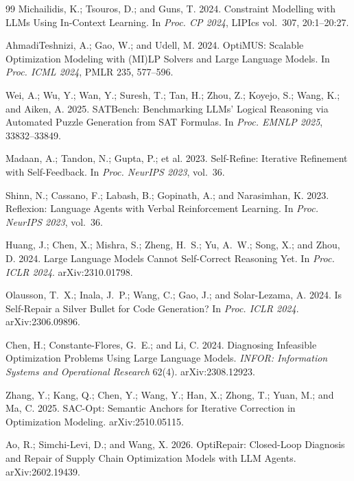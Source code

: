 \documentclass[letterpaper]{article}
\begin{document}
\begin{thebibliography}{99}
Michailidis, K.; Tsouros, D.; and Guns, T. 2024.
Constraint Modelling with LLMs Using In-Context Learning.
In \textit{Proc. CP 2024}, LIPIcs vol.~307, 20:1--20:27.

AhmadiTeshnizi, A.; Gao, W.; and Udell, M. 2024.
OptiMUS: Scalable Optimization Modeling with (MI)LP Solvers and Large
Language Models. In \textit{Proc. ICML 2024}, PMLR 235, 577--596.

Wei, A.; Wu, Y.; Wan, Y.; Suresh, T.; Tan, H.; Zhou, Z.; Koyejo, S.;
Wang, K.; and Aiken, A. 2025.
SATBench: Benchmarking LLMs' Logical Reasoning via Automated Puzzle
Generation from SAT Formulas. In \textit{Proc. EMNLP 2025}, 33832--33849.

Madaan, A.; Tandon, N.; Gupta, P.; et al. 2023.
Self-Refine: Iterative Refinement with Self-Feedback.
In \textit{Proc. NeurIPS 2023}, vol.~36.

Shinn, N.; Cassano, F.; Labash, B.; Gopinath, A.; and Narasimhan, K. 2023.
Reflexion: Language Agents with Verbal Reinforcement Learning.
In \textit{Proc. NeurIPS 2023}, vol.~36.

Huang, J.; Chen, X.; Mishra, S.; Zheng, H.~S.; Yu, A.~W.; Song, X.; and Zhou, D. 2024.
Large Language Models Cannot Self-Correct Reasoning Yet.
In \textit{Proc. ICLR 2024}. arXiv:2310.01798.

Olausson, T.~X.; Inala, J.~P.; Wang, C.; Gao, J.; and Solar-Lezama, A. 2024.
Is Self-Repair a Silver Bullet for Code Generation?
In \textit{Proc. ICLR 2024}. arXiv:2306.09896.

Chen, H.; Constante-Flores, G.~E.; and Li, C. 2024.
Diagnosing Infeasible Optimization Problems Using Large Language Models.
\textit{INFOR: Information Systems and Operational Research} 62(4).
arXiv:2308.12923.

Zhang, Y.; Kang, Q.; Chen, Y.; Wang, Y.; Han, X.; Zhong, T.; Yuan, M.;
and Ma, C. 2025.
SAC-Opt: Semantic Anchors for Iterative Correction in Optimization
Modeling. arXiv:2510.05115.

Ao, R.; Simchi-Levi, D.; and Wang, X. 2026.
OptiRepair: Closed-Loop Diagnosis and Repair of Supply Chain Optimization
Models with LLM Agents. arXiv:2602.19439.


\end{thebibliography}
\end{document}
